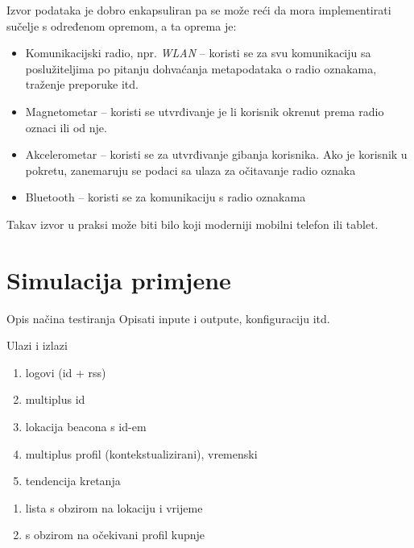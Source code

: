 \documentclass[times, utf8, diplomski, numeric]{fer}
\begin{document}
Izvor podataka je dobro enkapsuliran pa se može reći da mora implementirati
sučelje s određenom opremom, a ta oprema je:
\begin{itemize}
  \item Komunikacijski radio, npr. \emph{WLAN}  -- koristi
  se za svu komunikaciju sa poslužiteljima po pitanju dohvaćanja metapodataka o
  radio oznakama, traženje preporuke itd.
  \item Magnetometar -- koristi se utvrđivanje je li korisnik okrenut prema
  radio oznaci ili od nje. %
  \item Akcelerometar -- koristi se za utvrđivanje gibanja korisnika. Ako je
  korisnik u pokretu, zanemaruju se podaci sa ulaza za očitavanje radio oznaka
  \item Bluetooth -- koristi se za komunikaciju s radio oznakama
\end{itemize}

Takav izvor u praksi može biti bilo koji moderniji mobilni telefon ili tablet.

\section{Simulacija primjene}
Opis načina testiranja
Opisati inpute i outpute, konfiguraciju itd.

Ulazi i izlazi
\begin{enumerate}
  \item logovi (id + rss)
  \item multiplus id
  \item lokacija beacona s id-em
  \item multiplus profil (kontekstualizirani), vremenski
  \item tendencija kretanja
\end{enumerate}
\begin{enumerate}
  \item lista s obzirom na lokaciju i vrijeme
  \item s obzirom na očekivani profil kupnje
\end{enumerate}
\end{document}
